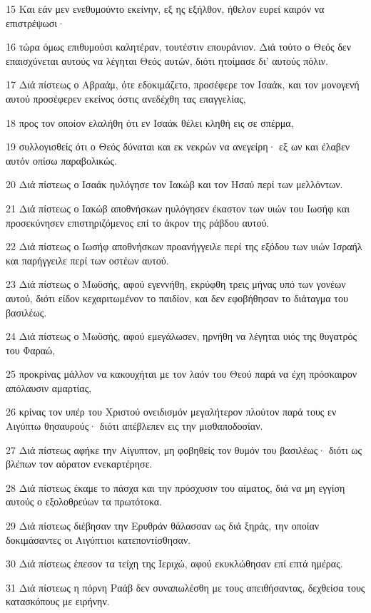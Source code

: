 \par 15 Και εάν μεν ενεθυμούντο εκείνην, εξ ης εξήλθον, ήθελον ευρεί καιρόν να επιστρέψωσι·
\par 16 τώρα όμως επιθυμούσι καλητέραν, τουτέστιν επουράνιον. Διά τούτο ο Θεός δεν επαισχύνεται αυτούς να λέγηται Θεός αυτών, διότι ητοίμασε δι' αυτούς πόλιν.
\par 17 Διά πίστεως ο Αβραάμ, ότε εδοκιμάζετο, προσέφερε τον Ισαάκ, και τον μονογενή αυτού προσέφερεν εκείνος όστις ανεδέχθη τας επαγγελίας,
\par 18 προς τον οποίον ελαλήθη ότι εν Ισαάκ θέλει κληθή εις σε σπέρμα,
\par 19 συλλογισθείς ότι ο Θεός δύναται και εκ νεκρών να ανεγείρη· εξ ων και έλαβεν αυτόν οπίσω παραβολικώς.
\par 20 Διά πίστεως ο Ισαάκ ηυλόγησε τον Ιακώβ και τον Ησαύ περί των μελλόντων.
\par 21 Διά πίστεως ο Ιακώβ αποθνήσκων ηυλόγησεν έκαστον των υιών του Ιωσήφ και προσεκύνησεν επιστηριζόμενος επί το άκρον της ράβδου αυτού.
\par 22 Διά πίστεως ο Ιωσήφ αποθνήσκων προανήγγειλε περί της εξόδου των υιών Ισραήλ και παρήγγειλε περί των οστέων αυτού.
\par 23 Διά πίστεως ο Μωϋσής, αφού εγεννήθη, εκρύφθη τρεις μήνας υπό των γονέων αυτού, διότι είδον κεχαριτωμένον το παιδίον, και δεν εφοβήθησαν το διάταγμα του βασιλέως.
\par 24 Διά πίστεως ο Μωϋσής, αφού εμεγάλωσεν, ηρνήθη να λέγηται υιός της θυγατρός του Φαραώ,
\par 25 προκρίνας μάλλον να κακουχήται με τον λαόν του Θεού παρά να έχη πρόσκαιρον απόλαυσιν αμαρτίας,
\par 26 κρίνας τον υπέρ του Χριστού ονειδισμόν μεγαλήτερον πλούτον παρά τους εν Αιγύπτω θησαυρούς· διότι απέβλεπεν εις την μισθαποδοσίαν.
\par 27 Διά πίστεως αφήκε την Αίγυπτον, μη φοβηθείς τον θυμόν του βασιλέως· διότι ως βλέπων τον αόρατον ενεκαρτέρησε.
\par 28 Διά πίστεως έκαμε το πάσχα και την πρόσχυσιν του αίματος, διά να μη εγγίση αυτούς ο εξολοθρεύων τα πρωτότοκα.
\par 29 Διά πίστεως διέβησαν την Ερυθράν θάλασσαν ως διά ξηράς, την οποίαν δοκιμάσαντες οι Αιγύπτιοι κατεποντίσθησαν.
\par 30 Διά πίστεως έπεσον τα τείχη της Ιεριχώ, αφού εκυκλώθησαν επί επτά ημέρας.
\par 31 Διά πίστεως η πόρνη Ραάβ δεν συναπωλέσθη με τους απειθήσαντας, δεχθείσα τους κατασκόπους με ειρήνην.
